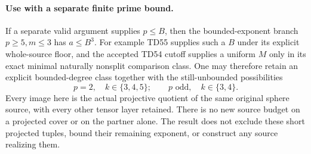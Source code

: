 \paragraph{Use with a separate finite prime bound.}
If a separate valid argument supplies \(p\le B\), then the
bounded-exponent branch \(p\ge5,m\le3\) has \(a\le B^3\).
For example TD55 supplies such a \(B\) under its explicit whole-source
floor, and the accepted TD54 cutoff supplies a uniform \(M\) only in
its exact minimal naturally nonsplit comparison class.
One may therefore retain an explicit bounded-degree class together
with the still-unbounded possibilities
\[
          p=2,\quad k\in\{3,4,5\};
          \qquad p\text{ odd},\quad k\in\{3,4\}.
 \tag{HRC.16}
\]
Every image here is the actual projective quotient of the same original
sphere source, with every other tensor layer retained.  There is no
new source budget on a projected cover or on the partner alone.
The result does not exclude these short projected tuples, bound their
remaining exponent, or construct any source realizing them.

